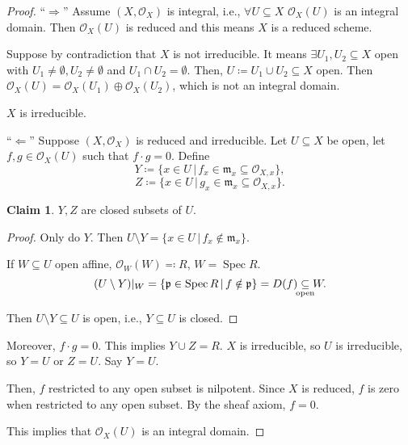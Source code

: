 \documentclass[12pt]{article}
\DeclareMathOperator{\Spec}{Spec}
\theoremstyle{definition}
\newtheorem*{claim}{Claim}
\theoremstyle{remark}
\begin{document}
\begin{proof}
``$\Rightarrow$'' Assume $(X,\mathcal{O}_X)$ is integral, i.e., $\forall U\subseteq X$ $\mathcal{O}_X(U)$ is an integral domain. Then $\mathcal{O}_X(U)$ is reduced and this means $X$ is a reduced scheme.

Suppose by contradiction that $X$ is not irreducible. It means $\exists U_1,U_2\subseteq X$ open with $U_1\neq\emptyset,U_2\neq\emptyset$ and $U_1\cap U_2=\emptyset$. Then, $U\coloneqq U_1\cup U_2\subseteq X$ open. Then $\mathcal{O}_X(U)=\mathcal{O}_X(U_1)\oplus\mathcal{O}_X(U_2)$, which is not an integral domain. \Lightning

$X$ is irreducible.

``$\Leftarrow$'' Suppose $(X,\mathcal{O}_X)$ is reduced and irreducible. Let $U\subseteq X$ be open, let $f,g\in\mathcal{O}_X(U)$ such that $f\cdot g=0$. Define
\[Y\coloneqq\{x\in U\,|\,f_x\in\mathfrak{m}_x\subseteq\mathcal{O}_{X,x}\},\]
\[Z\coloneqq\{x\in U\,|\,g_x\in\mathfrak{m}_x\subseteq\mathcal{O}_{X,x}\}.\]

\begin{claim}
$Y,Z$ are closed subsets of $U$.
\end{claim}

\begin{proof}
Only do $Y$. Then $U\setminus Y=\{x\in U\,|\,f_x\notin\mathfrak{m}_x\}$.

If $W\subseteq U$ open affine, $\mathcal{O}_W(W)\eqqcolon R$, $W=\Spec R$.
\[(U\setminus Y)|_W=\{\mathfrak{p}\in\Spec R\,|\,f\notin\mathfrak{p}\}=D(f)\underset{\mathclap{\text{open}}}{\subseteq}W.\]

Then $U\setminus Y\subseteq U$ is open, i.e., $Y\subseteq U$ is closed.
\end{proof}

Moreover, $f\cdot g=0$. This implies $Y\cup Z=R$. $X$ is irreducible, so $U$ is irreducible, so $Y=U$ or $Z=U$. Say $Y=U$.

Then, $f$ restricted to any open subset is nilpotent. Since $X$ is reduced, $f$ is zero when restricted to any open subset. By the sheaf axiom, $f=0$.

This implies that $\mathcal{O}_X(U)$ is an integral domain.
\end{proof}
\end{document}
